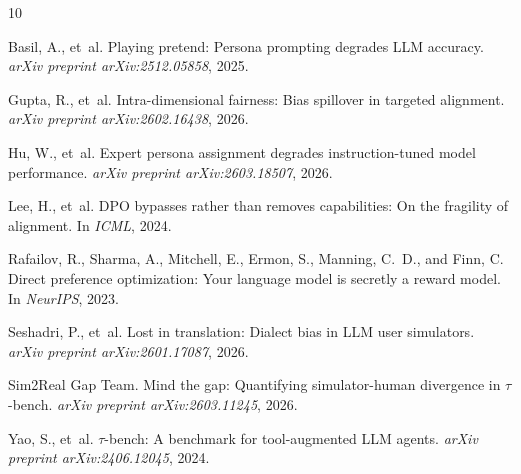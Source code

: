 \documentclass[11pt]{article}
\begin{document}


\begin{thebibliography}{10}

Basil, A., et~al.
\newblock Playing pretend: Persona prompting degrades LLM accuracy.
\newblock \emph{arXiv preprint arXiv:2512.05858}, 2025.

Gupta, R., et~al.
\newblock Intra-dimensional fairness: Bias spillover in targeted alignment.
\newblock \emph{arXiv preprint arXiv:2602.16438}, 2026.

Hu, W., et~al.
\newblock Expert persona assignment degrades instruction-tuned model performance.
\newblock \emph{arXiv preprint arXiv:2603.18507}, 2026.

Lee, H., et~al.
\newblock DPO bypasses rather than removes capabilities: On the fragility of alignment.
\newblock In \emph{ICML}, 2024.

Rafailov, R., Sharma, A., Mitchell, E., Ermon, S., Manning, C.~D., and Finn, C.
\newblock Direct preference optimization: Your language model is secretly a reward model.
\newblock In \emph{NeurIPS}, 2023.

Seshadri, P., et~al.
\newblock Lost in translation: Dialect bias in LLM user simulators.
\newblock \emph{arXiv preprint arXiv:2601.17087}, 2026.

{Sim2Real Gap Team}.
\newblock Mind the gap: Quantifying simulator-human divergence in $\tau$-bench.
\newblock \emph{arXiv preprint arXiv:2603.11245}, 2026.

Yao, S., et~al.
\newblock $\tau$-bench: A benchmark for tool-augmented LLM agents.
\newblock \emph{arXiv preprint arXiv:2406.12045}, 2024.

\end{thebibliography}
\end{document}
